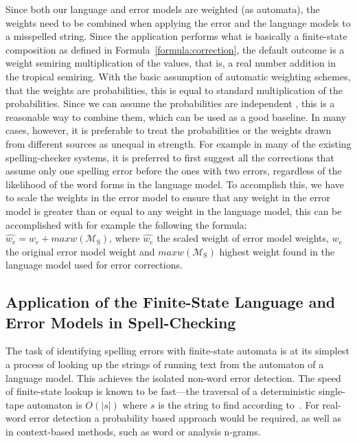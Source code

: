 \documentclass[a4paper,12pt]{article}
\begin{document}
Since both our language and error models are weighted (as automata), the
weights need to be combined when applying the error and the language models to
a misspelled string. Since the application performs what is basically a
finite-state composition as defined in Formula~\ref{formula:correction}, the
default outcome is a weight semiring multiplication of the values, that is, a
real number addition in the tropical semiring. With the basic assumption of
automatic weighting schemes, that the weights are probabilities, this is equal
to standard multiplication of the probabilities. Since we can assume the
probabilities are independent \cite[]{church1991probability}, this is a
reasonable way to combine them, which can be used as a good baseline. In many
cases, however, it is preferable to treat the probabilities or the weights
drawn from different sources as unequal in strength. For example in many of the
existing spelling-checker systems, it is preferred to first suggest all the
corrections that assume only one spelling error before the ones  with two
errors, regardless of the likelihood of the word forms in the language model.
To accomplish this, we have to scale the weights in the error model to ensure
that any weight in the error model is greater than or equal to any weight in
the language model, this can be accomplished with for example the following
the formula: $\hat{w_e} = w_e + maxw(\mathcal{M}_\mathrm{S})$,
where $\hat{w_e}$ the scaled weight of error model weights,
$w_e$ the original error model weight and $maxw(\mathcal{M}_\mathrm{S})$ 
highest weight found in the language model used for error corrections.

\subsection{Application of the Finite-State Language and Error Models in
Spell-Checking}

The task of identifying spelling errors with finite-state automata is at its
simplest a process of looking up the strings of running text from the automaton
of a language model. This achieves the isolated non-word error detection. The
speed of finite-state lookup is known to be fast---the traversal of a
deterministic single-tape automaton is $O(|s|)$ where $s$ is the string to find
according to~\cite{aho2007compilers}.  For real-word error detection a
probability based approach would be required, as well as in context-based
methods, such as word or analysis n-grams.
\end{document}
